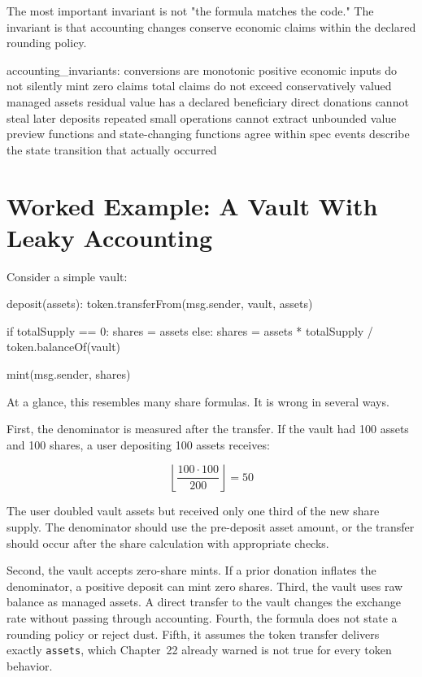 The most important invariant is not "the formula matches the code." The invariant is that accounting changes conserve economic claims within the declared rounding policy.

\begin{codeblock}
accounting_invariants:
    conversions are monotonic
    positive economic inputs do not silently mint zero claims
    total claims do not exceed conservatively valued managed assets
    residual value has a declared beneficiary
    direct donations cannot steal later deposits
    repeated small operations cannot extract unbounded value
    preview functions and state-changing functions agree within spec
    events describe the state transition that actually occurred
\end{codeblock}

\section{Worked Example: A Vault With Leaky Accounting}

Consider a simple vault:

\begin{codeblock}
deposit(assets):
    token.transferFrom(msg.sender, vault, assets)

    if totalSupply == 0:
        shares = assets
    else:
        shares = assets * totalSupply / token.balanceOf(vault)

    mint(msg.sender, shares)
\end{codeblock}

At a glance, this resembles many share formulas. It is wrong in several ways.

First, the denominator is measured after the transfer. If the vault had 100 assets and 100 shares, a user depositing 100 assets receives:

\[
\left\lfloor \frac{100 \cdot 100}{200} \right\rfloor = 50
\]

The user doubled vault assets but received only one third of the new share supply. The denominator should use the pre-deposit asset amount, or the transfer should occur after the share calculation with appropriate checks.

Second, the vault accepts zero-share mints. If a prior donation inflates the denominator, a positive deposit can mint zero shares. Third, the vault uses raw balance as managed assets. A direct transfer to the vault changes the exchange rate without passing through accounting. Fourth, the formula does not state a rounding policy or reject dust. Fifth, it assumes the token transfer delivers exactly \texttt{assets}, which Chapter~22 already warned is not true for every token behavior.

